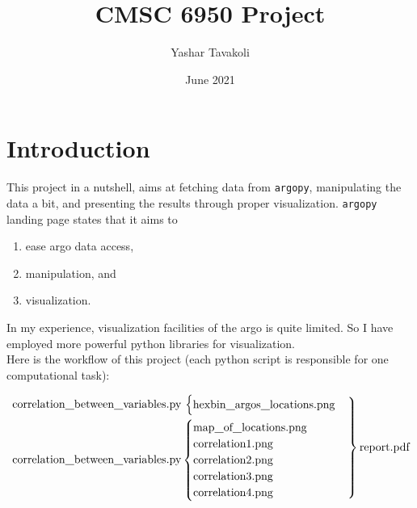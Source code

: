 \documentclass[12pt]{article}
\title{CMSC 6950 Project}
\date{June 2021}
\author{Yashar Tavakoli}
\begin{document}
\maketitle
\section{Introduction}

This project in a nutshell, aims at fetching data from \verb|argopy|, manipulating the data a bit, and presenting the results
through proper visualization. \verb|argopy| landing page states that it aims to 
\begin{enumerate}
    \item ease argo data access, 
    \item manipulation, and
    \item visualization. 
\end{enumerate} 
In my experience, visualization facilities of the argo is quite limited. So I have employed more powerful python
libraries for visualization. \\

Here is the workflow of this project (each python script is responsible for one computational task):

\begin{equation*}
    \begin{rcases}
    \text{correlation\underline{\hspace{8pt}}between\underline{\hspace{8pt}}variables.py}\hspace{2pt}\begin{cases}
      \text{hexbin\underline{\hspace{8pt}}argos\underline{\hspace{8pt}}locations.png}
    \end{cases}
    \\
    \text{correlation\underline{\hspace{8pt}}between\underline{\hspace{8pt}}variables.py}\begin{cases}
        \text{map\underline{\hspace{8pt}}of\underline{\hspace{8pt}}locations.png}\\
        \text{correlation1.png}\\
        \text{correlation2.png}\\
        \text{correlation3.png}\\
        \text{correlation4.png}
    \end{cases}
    \end{rcases}
    \text{report.pdf}
\end{equation*}
\end{document}
